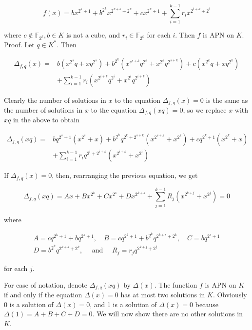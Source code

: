 \documentclass[10pt]{article}
\begin{document}
$$
f(x)=b x^{2^{s}+1}+b^{2^{k}} x^{2^{k+s}+2^{k}}+c x^{2^{k}+1}+\sum_{i=1}^{k-1} r_{i} x^{2^{i+k}+2^{i}}
$$

where $c \notin \mathbb{F}_{2^{k}}, b \in K$ is not a cube, and $r_{i} \in \mathbb{F}_{2^{k}}$ for each $i$. Then $f$ is APN on $K$.\\
Proof. Let $q \in K^{*}$. Then

$$
\begin{aligned}
\Delta_{f, q}(x)= & b\left(x^{2^{s}} q+x q^{2^{s}}\right)+b^{2^{k}}\left(x^{s^{s+k}} q^{2^{k}}+x^{2^{k}} q^{2^{s+k}}\right)+c\left(x^{2^{k}} q+x q^{2^{k}}\right) \\
& +\sum_{i=1}^{k-1} r_{i}\left(x^{2^{i+k}} q^{2^{i}}+x^{2^{i}} q^{2^{i+k}}\right)
\end{aligned}
$$

Clearly the number of solutions in $x$ to the equation $\Delta_{f, q}(x)=0$ is the same as the number of solutions in $x$ to the equation $\Delta_{f, q}(x q)=0$, so we replace $x$ with $x q$ in the above to obtain

$$
\begin{aligned}
\Delta_{f, q}(x q)= & b q^{2^{s}+1}\left(x^{2^{s}}+x\right)+b^{2^{k}} q^{2^{k}+2^{s+k}}\left(x^{2^{s+k}}+x^{2^{k}}\right)+c q^{2^{k}+1}\left(x^{2^{k}}+x\right) \\
& +\sum_{i=1}^{k-1} r_{i} q^{2^{i}+2^{i+k}}\left(x^{2^{i+k}}+x^{2^{i}}\right)
\end{aligned}
$$

If $\Delta_{f, q}(x)=0$, then, rearranging the previous equation, we get


\begin{equation*}
\Delta_{f, q}(x q)=A x+B x^{2^{k}}+C x^{2^{s}}+D x^{2^{k+s}}+\sum_{j=1}^{k-1} R_{j}\left(x^{2^{k+j}}+x^{2^{j}}\right)=0 \tag{4}
\end{equation*}


where

$$
\begin{gathered}
A=c q^{2^{k}+1}+b q^{2^{s}+1}, \quad B=c q^{2^{k}+1}+b^{2^{k}} q^{2^{k+s}+2^{k}}, \quad C=b q^{2^{s}+1} \\
D=b^{2^{k}} q^{2^{k+s}+2^{k}}, \quad \text { and } \quad R_{j}=r_{j} q^{2^{k+j}+2^{j}}
\end{gathered}
$$

for each $j$.

For ease of notation, denote $\Delta_{f, q}(x q)$ by $\Delta(x)$. The function $f$ is APN on $K$ if and only if the equation $\Delta(x)=0$ has at most two solutions in $K$. Obviously 0 is a solution of $\Delta(x)=0$, and 1 is a solution of $\Delta(x)=0$ because $\Delta(1)=A+B+C+D=0$. We will now show there are no other solutions in $K$.
\end{document}
